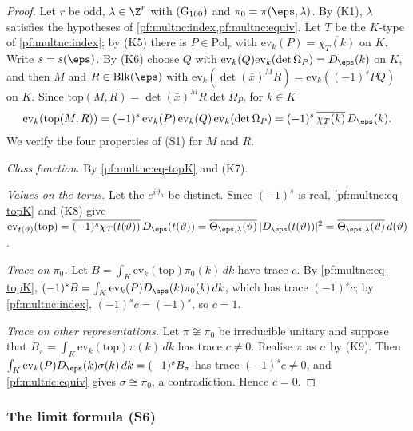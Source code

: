 \begin{proof}
Let $r$ be odd, $\lambda\in\Z^r$ with $\textup{(G$_{100}$)}$ and $\pi_0=\pi(\eps,\lambda)$. By (K1), $\lambda$ satisfies the
hypotheses of \cref{pf:multnc:index,pf:multnc:equiv}. Let $T$ be the $K$-type of \cref{pf:multnc:index}; by (K5) there is
$P\in\mathrm{Pol}_r$ with $\mathrm{ev}_k(P)=\overline{\chi_T(k)}$ on $K$. Write $s=s(\eps)$. By (K6) choose $Q$ with
$\mathrm{ev}_k(Q)\mathrm{ev}_k(\det\Omega_P)=D_\eps(k)$ on $K$, and then $M$ and $R\in\mathrm{Blk}(\eps)$ with
$\mathrm{ev}_k(\det(\bar x)^MR)=\mathrm{ev}_k((-1)^sPQ)$ on $K$. Since $\mathrm{top}(M,R)=\det(\bar x)^MR\det\Omega_P$, for
$k\in K$
\begin{equation}\label{pf:multnc:eq-topK}
\mathrm{ev}_k(\mathrm{top}(M,R))=(-1)^s\,\mathrm{ev}_k(P)\,\mathrm{ev}_k(Q)\,\mathrm{ev}_k(\det\Omega_P)=
(-1)^s\,\overline{\chi_T(k)}\,D_\eps(k).
\end{equation}
We verify the four properties of (S1) for $M$ and $R$.

\emph{Class function.} By \eqref{pf:multnc:eq-topK} and (K7).

\emph{Values on the torus.} Let the $e^{i\vartheta_a}$ be distinct. Since $(-1)^s$ is real, \eqref{pf:multnc:eq-topK} and
(K8) give $\mathrm{ev}_{t(\vartheta)}(\mathrm{top})=\overline{(-1)^s\chi_T(t(\vartheta))}\,D_\eps(t(\vartheta))=
\overline{\Theta_{\eps,\lambda}(\vartheta)}\,|D_\eps(t(\vartheta))|^2=\overline{\Theta_{\eps,\lambda}(\vartheta)}\,
d(\vartheta)$.

\emph{Trace on $\pi_0$.} Let $B=\int_K\mathrm{ev}_k(\mathrm{top})\pi_0(k)\,dk$ have trace $c$. By
\eqref{pf:multnc:eq-topK}, $(-1)^sB=\int_K\mathrm{ev}_k(P)D_\eps(k)\pi_0(k)\,dk$, which has trace $(-1)^sc$; by
\cref{pf:multnc:index}, $(-1)^sc=(-1)^s$, so $c=1$.

\emph{Trace on other representations.} Let $\pi\not\cong\pi_0$ be irreducible unitary and suppose that
$B_\pi=\int_K\mathrm{ev}_k(\mathrm{top})\pi(k)\,dk$ has trace $c\ne0$. Realise $\pi$ as $\sigma$ by (K9). Then
$\int_K\mathrm{ev}_k(P)D_\eps(k)\sigma(k)\,dk=(-1)^sB_\pi$ has trace $(-1)^sc\ne0$, and \cref{pf:multnc:equiv} gives
$\sigma\cong\pi_0$, a contradiction. Hence $c=0$.
\end{proof}

\subsubsection*{The limit formula (S6)}

